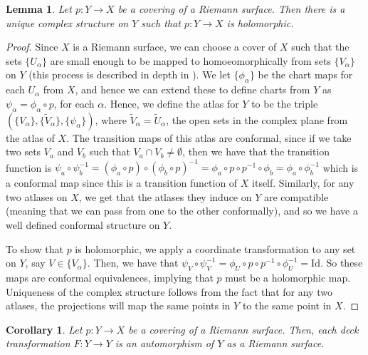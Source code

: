 \documentclass[11pt]{report}
\newtheorem{lemma}[thm]{Lemma}
\newtheorem{cor}[thm]{Corollary}
\theoremstyle{definition}
\begin{document}
\begin{lemma}
  Let $p:Y \rightarrow X$ be a covering of a Riemann surface. Then there is a unique complex structure on $Y$ such that $p:Y \rightarrow X$ is holomorphic.
\end{lemma}
\begin{proof}
  Since $X$ is a Riemann surface, we can choose a cover of $X$ such that the sets $\{U_{\alpha}\}$ are small enough to be mapped to homoeomorphically from sets $\{V_{\alpha}\}$ on $Y$ (this process is described in depth in \cite[(p.171, Theorem 4.11.2)]{comfun}). We let $\{\phi_{\alpha}\}$ be the chart maps for each $U_{\alpha}$ from $X$, and hence we can extend these to define charts from $Y$ as $\psi_{\alpha} = \phi_{\alpha} \circ p$, for each $\alpha$. Hence, we define the atlas for $Y$ to be the triple $(\{V_{\alpha}\},\{\tilde{V}_{\alpha}\},\{\psi_{\alpha}\})$, where $\tilde{V}_{\alpha} = \tilde{U}_{\alpha}$, the open sets in the complex plane from the atlas of $X$. The transition maps of this atlas are conformal, since if we take two sets $V_a$ and $V_b$ such that $V_a \cap V_b \neq \emptyset$, then we have that the transition function is $\psi_{a}\circ\psi_{b}^{-1} = (\phi_{a}\circ p)\circ (\phi_{b} \circ p)^{-1} = \phi_{a}\circ p \circ p^{-1}\circ \phi_{b}=\phi_{a}\circ\phi_b^{-1}$ which is a conformal map since this is a transition function of $X$ itself. Similarly, for any two atlases on $X$, we get that the atlases they induce on $Y$ are compatible (meaning that we can pass from one to the other conformally), and so we have a well defined conformal structure on $Y$. 

  To show that $p$ is holomorphic, we apply a coordinate transformation to any set on $Y$, say $V\in \{V_{\alpha}\}$. Then, we have that $\psi_{V} \circ \psi_{V}^{-1} = \phi_{U}\circ p\circ p^{-1}\circ \phi_{U}^{-1} = \text{Id}$. So these maps are conformal equivalences, implying that $p$ must be a holomorphic map. Uniqueness of the complex structure follows from the fact that for any two atlases, the projections will map the same points in $Y$ to the same point in $X$.
\end{proof}
\begin{cor}
  Let $p:Y \rightarrow X$ be a covering of a Riemann surface. Then, each deck  transformation $F:Y \rightarrow Y$ is an automorphism of $Y$ as a Riemann surface.
\end{cor}
\end{document}
